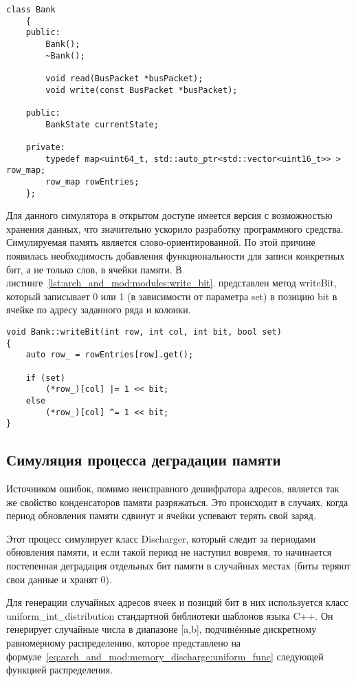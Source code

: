 \begin{lstlisting}[style=cplusplusstyle, caption={Класс Bank}, label=lst:arch_and_mod:modules:bank]
class Bank
    {
    public:
        Bank();
        ~Bank();

        void read(BusPacket *busPacket);
        void write(const BusPacket *busPacket);

    public:
        BankState currentState;

    private:
        typedef map<uint64_t, std::auto_ptr<std::vector<uint16_t>> > row_map;
        row_map rowEntries;
    };
\end{lstlisting}

Для данного симулятора в открытом доступе имеется версия с возможностью хранения данных, что значительно ускорило разработку программного средства. Симулируемая память является слово-ориентированной. По этой причине появилась необходимость добавления функциональности для записи конкретных бит, а не только слов, в ячейки памяти. В листинге~\ref{lst:arch_and_mod:modules:write_bit}. представлен метод writeBit, который записывает 0 или 1 (в зависимости от параметра set) в позицию bit в ячейке по адресу заданного ряда и колонки.

\begin{lstlisting}[style=cplusplusstyle, caption={Метод записи конкретных бит в слове}, label=lst:arch_and_mod:modules:write_bit]
void Bank::writeBit(int row, int col, int bit, bool set)
{
    auto row_ = rowEntries[row].get();

    if (set)
        (*row_)[col] |= 1 << bit;
    else
        (*row_)[col] ^= 1 << bit;
}
\end{lstlisting}

\subsection{Симуляция процесса деградации памяти}
\label{sub:arch_and_mod:memory_discharge}

Источником ошибок, помимо неисправного дешифратора адресов, является так же свойство конденсаторов памяти разряжаться. Это происходит в случаях, когда период обновления памяти сдвинут и ячейки успевают терять свой заряд.

Этот процесс симулирует класс Discharger, который следит за периодами обновления памяти, и если такой период не наступил вовремя, то начинается постепенная деградация отдельных бит памяти в случайных местах (биты теряют свои данные и хранят 0). 

Для генерации случайных адресов ячеек и позиций бит в них используется класс uniform\_int\_distribution стандартной библиотеки шаблонов языка C++. 
Он генерирует случайные числа в диапазоне [a,b], подчинённые дискретному равномерному распределению, которое представлено на формуле~\ref{eq:arch_and_mod:memory_discharge:uniform_func} следующей функцией распределения.

